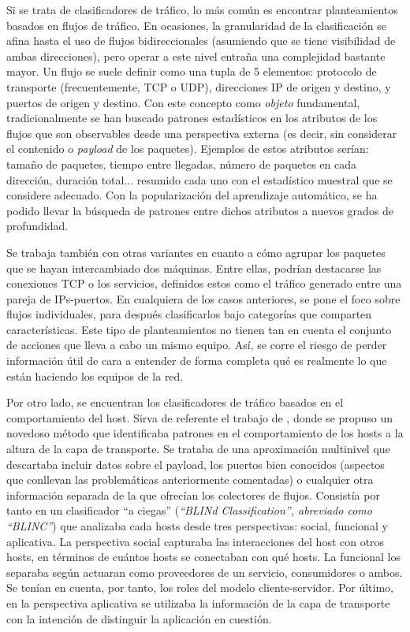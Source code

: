 Si se trata de clasificadores de tráfico, lo más común es encontrar planteamientos basados en flujos de tráfico.
En ocasiones, la granularidad de la clasificación se afina hasta el uso de flujos bidireccionales (asumiendo que se tiene visibilidad de ambas direcciones), pero operar a este nivel entraña una complejidad bastante mayor.
Un flujo se suele definir como una tupla de 5 elementos: protocolo de transporte (frecuentemente, TCP o UDP), direcciones IP de origen y destino, y puertos de origen y destino.
Con este concepto como \emph{objeto} fundamental, tradicionalmente se han buscado patrones estadísticos en los atributos de los flujos que son observables desde una perspectiva externa (es decir, sin considerar el contenido o \emph{payload} de los paquetes).
Ejemplos de estos atributos serían: tamaño de paquetes, tiempo entre llegadas, número de paquetes en cada dirección, duración total... resumido cada uno con el estadístico muestral que se considere adecuado.
Con la popularización del aprendizaje automático, se ha podido llevar la búsqueda de patrones entre dichos atributos a nuevos grados de profundidad.

Se trabaja también con otras variantes en cuanto a cómo agrupar los paquetes que se hayan intercambiado dos máquinas.
Entre ellas, podrían destacarse las conexiones TCP o los servicios, definidos estos como el tráfico generado entre una pareja de IPs-puertos.
En cualquiera de los casos anteriores, se pone el foco sobre flujos individuales, para después clasificarlos bajo categorías que comparten características.
Este tipo de planteamientos no tienen tan en cuenta el conjunto de acciones que lleva a cabo un mismo equipo.
Así, se corre el riesgo de perder información útil de cara a entender de forma completa qué es realmente lo que están haciendo los equipos de la red.

Por otro lado, se encuentran los clasificadores de tráfico basados en el comportamiento del host.
Sirva de referente el trabajo de \cite{KPF05}, donde se propuso un novedoso método que identificaba patrones en el comportamiento de los hosts a la altura de la capa de transporte.
Se trataba de una aproximación multinivel que descartaba incluir datos sobre el payload, los puertos bien conocidos (aspectos que conllevan las problemáticas anteriormente comentadas) o cualquier otra información separada de la que ofrecían los colectores de flujos.
Consistía por tanto en un clasificador ``a ciegas'' (\emph{``BLINd Classification'', abreviado como ``BLINC''}) que analizaba cada hosts desde tres perspectivas: social, funcional y aplicativa.
La perspectiva social capturaba las interacciones del host con otros hosts, en términos de cuántos hosts se conectaban con qué hosts.
La funcional los separaba según actuaran como proveedores de un servicio, consumidores o ambos.
Se tenían en cuenta, por tanto, los roles del modelo cliente-servidor.
Por último, en la perspectiva aplicativa se utilizaba la información de la capa de transporte con la intención de distinguir la aplicación en cuestión.

